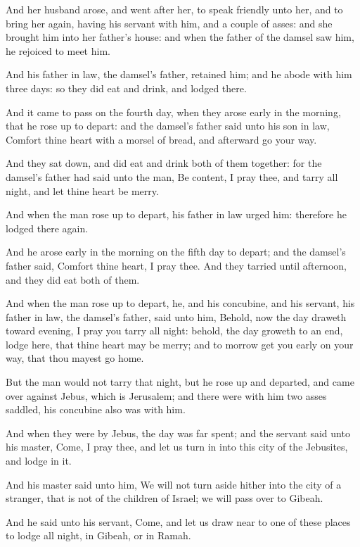 \Verse And her husband arose, and went after her, to speak friendly unto her, and to bring her again, having his servant with him, and a couple of asses: and she brought him into her father's house: and when the father of the damsel saw him, he rejoiced to meet him.

\Verse And his father in law, the damsel's father, retained him; and he abode with him three days: so they did eat and drink, and lodged there.

\Verse And it came to pass on the fourth day, when they arose early in the morning, that he rose up to depart: and the damsel's father said unto his son in law, Comfort thine heart with a morsel of bread, and afterward go your way.

\Verse And they sat down, and did eat and drink both of them together: for the damsel's father had said unto the man, Be content, I pray thee, and tarry all night, and let thine heart be merry.

\Verse And when the man rose up to depart, his father in law urged him: therefore he lodged there again.

\Verse And he arose early in the morning on the fifth day to depart; and the damsel's father said, Comfort thine heart, I pray thee. And they tarried until afternoon, and they did eat both of them.

\Verse And when the man rose up to depart, he, and his concubine, and his servant, his father in law, the damsel's father, said unto him, Behold, now the day draweth toward evening, I pray you tarry all night: behold, the day groweth to an end, lodge here, that thine heart may be merry; and to morrow get you early on your way, that thou mayest go home.

\Verse But the man would not tarry that night, but he rose up and departed, and came over against Jebus, which is Jerusalem; and there were with him two asses saddled, his concubine also was with him.

\Verse And when they were by Jebus, the day was far spent; and the servant said unto his master, Come, I pray thee, and let us turn in into this city of the Jebusites, and lodge in it.

\Verse And his master said unto him, We will not turn aside hither into the city of a stranger, that is not of the children of Israel; we will pass over to Gibeah.

\Verse And he said unto his servant, Come, and let us draw near to one of these places to lodge all night, in Gibeah, or in Ramah.

